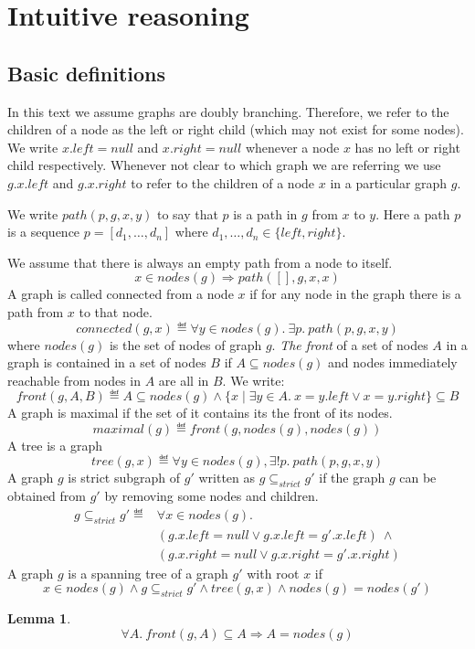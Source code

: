 \documentclass[]{scrartcl}
\newtheorem{lemma}{Lemma}
\newcommand{\path}{\mathit{path}}
\newcommand{\connected}{\mathit{connected}}
\newcommand{\nodes}{\mathit{nodes}}
\newcommand{\front}{\mathit{front}}
\newcommand{\maximal}{\mathit{maximal}}
\newcommand{\Left}{\mathit{left}}
\newcommand{\Right}{\mathit{right}}
\newcommand{\tree}{\mathit{tree}}
\newcommand{\Null}{\mathit{null}}
\newcommand{\strictSG}{\subseteq_{\mathit{strict}}}
\begin{document}
\section{Intuitive reasoning}\label{sect:int:reas}
\subsection{Basic definitions}
In this text we assume graphs are doubly branching.
Therefore, we refer to the children of a node as the left or right child (which may not exist for some nodes).
We write $x.\Left = \Null$ and $x.\Right = \Null$ whenever a node $x$ has no left or right child respectively.
Whenever not clear to which graph we are referring we use $g.x.\Left$ and $g.x.\Right$ to refer to the children of a node $x$ in a particular graph $g$.

We write $\path(p, g, x, y)$ to say that $p$ is a path in $g$ from $x$ to $y$.
Here a path $p$ is a sequence
$p = [d_1, \dots, d_n ]$ where $d_1,\dots, d_n \in \{\Left, \Right\}$.

We assume that there is always an empty path from a node to itself.
\[
x \in \nodes(g) \Rightarrow \path([], g, x, x)
\]
A graph is called connected from a node $x$ if for any node in the graph there is a path from $x$ to that node.
\[
\connected(g, x) \eqdef \forall y \in \nodes(g).~ \exists p.~\path(p, g, x, y)
\]
where $\nodes(g)$ is the set of nodes of graph $g$.
\emph{The front} of a set of nodes $A$ in a graph is contained in
a set of nodes $B$ if $A \subseteq \nodes(g)$ and nodes immediately reachable
from nodes in $A$ are all in $B$. We write:
\[
\front(g, A, B) \eqdef A \subseteq \nodes(g) \land
\{x \mid \exists y \in A.~x = y.\Left \lor x = y.\Right \} \subseteq B
\]
A graph is maximal if the set of it contains its the front of its nodes.
\[
\maximal(g) \eqdef \front(g, \nodes(g), \nodes(g))
\]
A tree is a graph
\[
\tree(g, x) \eqdef \forall y \in \nodes(g), \exists! p.~\path(p, g, x, y)
\]
A graph $g$ is strict subgraph of $g'$ written as $g \strictSG g'$
if the graph $g$ can be obtained from $g'$ by removing some nodes and children.
\[
\begin{array}{ll}
g \strictSG g' \eqdef & \forall x \in \nodes(g).\\
& (g.x.\Left = \Null \lor g.x.\Left = g'.x.\Left)~\land \\
& (g.x.\Right = \Null \lor g.x.\Right = g'.x.\Right)
\end{array}
\]
A graph $g$ is a spanning tree of a graph $g'$ with root $x$ if
\[
x \in \nodes(g) \land g \strictSG g' \land \tree(g, x) \land \nodes(g) = \nodes(g')
\]
\begin{lemma}\label{lem:in_front_nodes}
\[
\forall A.~ \front(g, A) \subseteq A \Rightarrow A = \nodes(g)
\]
\end{lemma}
\end{document}
